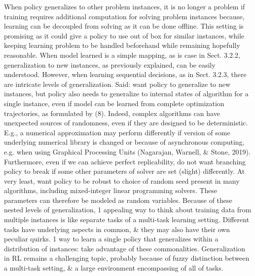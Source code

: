 \documentclass{article}
\begin{document}
\begin{itemize}
\begin{itemize}
        When policy generalizes to other problem instances, it is no longer a problem if training requires additional computation for solving problem instances because, learning can be decoupled from solving as it can be done offline. This setting is promising as it could give a policy to use out of box for similar instances, while keeping learning problem to be handled beforehand while remaining hopefully reasonable. When model learned is a simple mapping, as is case in Sect. 3.2.2, generalization to new instances, as previously explained, can be easily understood. However, when learning sequential decisions, as in Sect. 3.2.3, there are intricate levels of generalization. Said: want policy to generalize to new instances, but policy also needs to generalize to internal states of algorithm for a single instance, even if model can be learned from complete optimization trajectories, as formulated by (8). Indeed, complex algorithms can have unexpected sources of randomness, even if they are designed to be deterministic. E.g., a numerical approximation may perform differently if version of some underlying numerical library is changed or because of asynchronous computing, e.g. when using Graphical Processing Units (Nagarajan, Warnell, \& Stone, 2019). Furthermore, even if we can achieve perfect replicability, do not want branching policy to break if some other parameters of solver are set (slight) differently. At very least, want policy to be robust to choice of random seed present in many algorithms, including mixed-integer linear programming solvers. These parameters can therefore be modeled as random variables. Because of these nested levels of generalization, 1 appealing way to think about training data from multiple instances is like separate tasks of a multi-task learning setting. Different tasks have underlying aspects in common, \& they may also have their own peculiar quirks. 1 way to learn a single policy that generalizes within a distribution of instances: take advantage of these commonalities. Generalization in RL remains a challenging topic, probably because of fuzzy distinction between a multi-task setting, \& a large environment encompassing of all of tasks.


\end{itemize}
\end{itemize}
\end{document}
